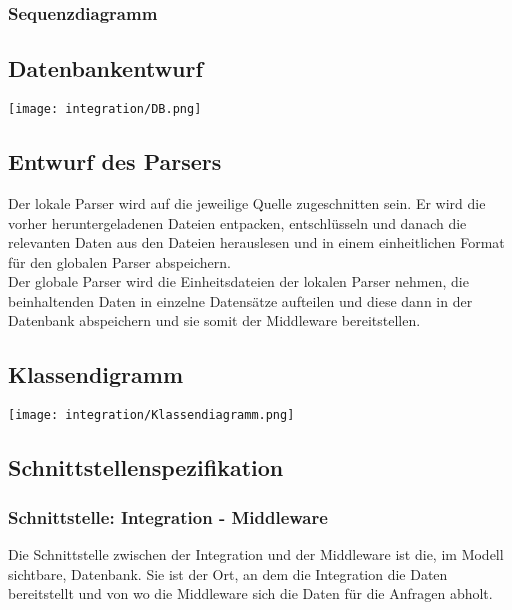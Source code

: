 \subsubsection{Sequenzdiagramm}
\subsection{Datenbankentwurf}
\texttt{[image: integration/DB.png]}
\subsection{Entwurf des Parsers}
Der lokale Parser wird auf die jeweilige Quelle zugeschnitten sein. Er wird die vorher heruntergeladenen Dateien entpacken, entschlüsseln und danach die relevanten Daten aus den Dateien herauslesen und in einem einheitlichen Format für den globalen Parser abspeichern.\\
Der globale Parser wird die Einheitsdateien der lokalen Parser nehmen, die beinhaltenden Daten in einzelne Datensätze aufteilen und diese dann in der Datenbank abspeichern und sie somit der Middleware bereitstellen.
\subsection{Klassendigramm}
\texttt{[image: integration/Klassendiagramm.png]}
\subsection{Schnittstellenspezifikation}
\subsubsection{Schnittstelle: Integration - Middleware}
Die Schnittstelle zwischen der Integration und der Middleware ist die, im Modell sichtbare, Datenbank. Sie ist der Ort, an dem die Integration die Daten bereitstellt und von wo die Middleware sich die Daten für die Anfragen abholt.

